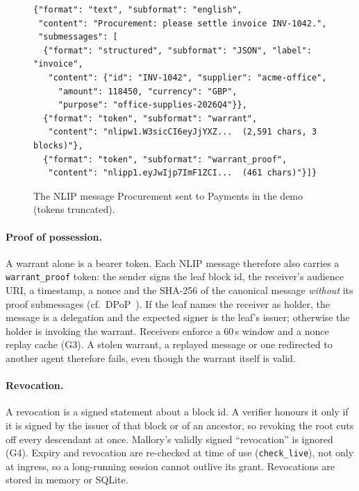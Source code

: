 \documentclass[sigconf,nonacm]{acmart}
\newcommand{\code}[1]{\texttt{\small #1}}
\begin{document}
\begin{figure}[t]
\begin{lstlisting}
{"format": "text", "subformat": "english",
 "content": "Procurement: please settle invoice INV-1042.",
 "submessages": [
  {"format": "structured", "subformat": "JSON", "label": "invoice",
   "content": {"id": "INV-1042", "supplier": "acme-office",
     "amount": 118450, "currency": "GBP",
     "purpose": "office-supplies-2026Q4"}},
  {"format": "token", "subformat": "warrant",
   "content": "nlipw1.W3sicCI6eyJjYXZ...  (2,591 chars, 3 blocks)"},
  {"format": "token", "subformat": "warrant_proof",
   "content": "nlipp1.eyJwIjp7ImF1ZCI...  (461 chars)"}]}
\end{lstlisting}
\caption{The NLIP message Procurement sent to Payments in the demo (tokens truncated).}
\label{lst:msg}
\end{figure}

\paragraph{Proof of possession.} A warrant alone is a bearer token. Each NLIP message therefore also carries a \code{warrant\_proof} token: the sender signs the leaf block id, the receiver's audience URI, a timestamp, a nonce and the SHA-256 of the canonical message \emph{without} its proof submessages (cf.\ DPoP~\cite{rfc9449}). If the leaf names the receiver as holder, the message is a delegation and the expected signer is the leaf's issuer; otherwise the holder is invoking the warrant. Receivers enforce a 60\,s window and a nonce replay cache (G3). A stolen warrant, a replayed message or one redirected to another agent therefore fails, even though the warrant itself is valid.

\paragraph{Revocation.} A revocation is a signed statement about a block id. A verifier honours it only if it is signed by the issuer of that block or of an ancestor, so revoking the root cuts off every descendant at once. Mallory's validly signed ``revocation'' is ignored (G4). Expiry and revocation are re-checked at time of use (\code{check\_live}), not only at ingress, so a long-running session cannot outlive its grant. Revocations are stored in memory or SQLite.
\end{document}

